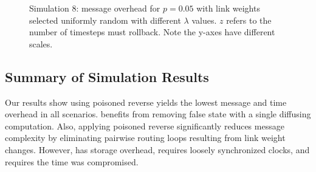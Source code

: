 \begin{figure}
\centering
{}
\caption{Simulation 8: message overhead for $p=0.05$ \er with link weights selected uniformly random with different $\lambda$ values. $z$ refers to the number of timesteps \cpr must 
rollback. Note the y-axes have different scales.}
\label{fig:lc-fixk}
\end{figure} 


\subsection{Summary of Simulation Results}
\label{subsec:discuss}


Our results show \cpr using poisoned reverse yields the lowest message and time overhead in all scenarios. \cpr benefits from removing false state with a single
diffusing computation. Also, applying poisoned reverse significantly reduces \cpr message complexity by eliminating pairwise routing loops resulting from
link weight changes. However, \cpr has storage overhead, requires loosely synchronized clocks, and requires the time \bad was compromised.

